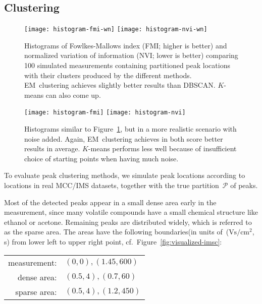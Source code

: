 \documentclass{article}
\begin{document}
\subsection{Clustering}
\label{sec:eval:clustering}

\begin{figure}[t]\centering
\texttt{[image: histogram-fmi-wn]}
\texttt{[image: histogram-nvi-wn]}
\caption{
Histograms of Fowlkes-Mallows index (FMI; higher is better) and normalized variation of information (NVI; lower is better) comparing 100 simulated measurements containing partitioned peak locations with their clusters produced by the different methods.
EM~clustering achieves slightly better results than DBSCAN.
$K$-means can also come up.
}
\label{fig:clusterresultswn}
\end{figure}

\begin{figure}[t]\centering
\texttt{[image: histogram-fmi]}
\texttt{[image: histogram-nvi]}
\caption{
Histograms similar to Figure~\ref{fig:clusterresultswn}, but in a more realistic scenario with noise added.
Again, EM~clustering achieves in both score better results in average.
$K$-means performs less well because of insufficient choice of starting points when having much noise.
}
\label{fig:clusterresults}
\end{figure}


To evaluate peak clustering methods, we simulate peak locations according to locations in real MCC/IMS datasets, together with the true partition~$\mathcal{P}$ of peaks.

Most of the detected peaks appear in a small dense area early in the measurement, since many volatile compounds have a small chemical structure like ethanol or acetone.
Remaining peaks are distributed widely, which is referred to as the sparse area.
The areas have the following boundaries(in units of~($\text{Vs}/\text{cm}^2$, s) from lower left to upper right point, cf.\ Figure~\ref{fig:visualized-imsc}:
\begin{center}\begin{tabular}{r@{ }l}
measurement: & $(0, 0), (1.45, 600)$\\
dense area: & $(0.5, 4), (0.7, 60)$\\
sparse area: & $(0.5, 4), (1.2, 450)$
\end{tabular}\end{center}
\end{document}
